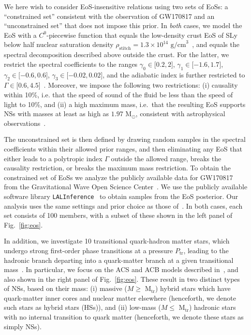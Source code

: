 \documentclass[prd,twocolumn,nofootinbib,superscriptaddress,amsmath,amssymb]{revtex4-1}
\begin{document}
We here wish to consider EoS-insensitive relations using two sets of EoSs: a ``constrained set'' consistent with the observation of GW170817 and an ``unconstrained set'' that does not impose this prior. In \emph{both} cases, we model the EoS with a $C^{0}$-piecewise function that equals the low-density crust EoS of SLy~\cite{Douchin:2001sv} below half nuclear saturation density $\rho_{\text{stitch}}=1.3 \times 10^{14} \text{ g/cm}^3$~\cite{Read2009}, and equals the spectral decomposition described above outside the crust. For the latter, we restrict the spectral coefficients to the ranges $\gamma_0 \in \lbrack 0.2,2 \rbrack$, $\gamma_1 \in \lbrack -1.6,1.7 \rbrack$, $\gamma_2 \in \lbrack -0.6,0.6 \rbrack$, $\gamma_3 \in \lbrack -0.02,0.02 \rbrack$, and the adiabatic index is further restricted to $\Gamma \in \lbrack 0.6,4.5 \rbrack$~\cite{Lindblom:parameters}. Moreover, we impose the following two restrictions:  (i) causality within 10\%, i.e. that the speed of sound of the fluid be less than the speed of light to 10\%, and (ii) a high maximum mass, i.e.~that the resulting EoS supports NSs with masses at least as high as $1.97 \text{ M}_{\odot}$, consistent with astrophysical observations~\cite{1.97NS,2.01NS,Zhao:massiveNS}. 

The unconstrained set is then defined by drawing random samples in the spectral coefficients within their allowed prior ranges, and then eliminating any EoS that either leads to a polytropic index $\Gamma$ outside the allowed range, breaks the causality restriction, or breaks the maximum mass restriction. 
To obtain the constrained set of EoSs we analyze the publicly available data for GW170817 from the Gravitational Wave Open Science Center~\cite{GWOSC,Vallisneri:2014vxa}. We use the publicly available software library {\tt LALInference}~\cite{Veitch:2014wba,lalinference_o2} to obtain samples from the EoS posterior. Our analysis uses the same settings and prior choice as those of~\cite{LIGO:posterior,Carney:2018sdv}. 
In both cases, each set consists of 100 members, with a subset of these shown in the left panel of Fig.~\ref{fig:eos}.

In addition, we investigate 10 transitional quark-hadron matter stars, which undergo strong first-order phase transitions at a pressure $P_{\text{tr}}$, leading to the hadronic branch departing into a quark-matter branch at a given transitional mass~\cite{Paschalidis2018,Alford:2017qgh,1971SvA....15..347S,Zdunik:2012dj,Alford:2013aca}. In particular, we focus on the ACS and ACB models described in~\cite{Paschalidis2018}, and also shown in the right panel of Fig.~\ref{fig:eos}. These result in two distinct types of NSs, based on their mass: (i) massive ($M \geq \text{ M}_{\text{tr}}$) hybrid stars which have quark-matter inner cores and nuclear matter elsewhere (henceforth, we denote such stars as hybrid stars (HSs)), and (ii) low-mass ($M \leq \text{ M}_{\text{tr}}$) hadronic stars with no internal transition to quark matter (henceforth, we denote these stars as simply NSs).
\end{document}
